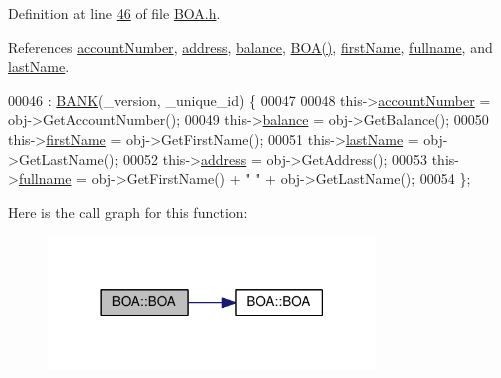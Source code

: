 Definition at line \hyperlink{_b_o_a_8h_source_l00046}{46} of file \hyperlink{_b_o_a_8h_source}{B\+O\+A.\+h}.



References \hyperlink{_b_o_a_8h_source_l00098}{account\+Number}, \hyperlink{_b_o_a_8h_source_l00100}{address}, \hyperlink{_b_o_a_8h_source_l00099}{balance}, \hyperlink{_b_o_a_8h_source_l00024}{B\+O\+A()}, \hyperlink{_b_o_a_8h_source_l00096}{first\+Name}, \hyperlink{_b_o_a_8h_source_l00095}{fullname}, and \hyperlink{_b_o_a_8h_source_l00097}{last\+Name}.


\begin{DoxyCode}
00046                                                                : \hyperlink{class_b_a_n_k_a0bc938356cebff14fb0560264abe5a34_a0bc938356cebff14fb0560264abe5a34}{BANK}(\_version, \_unique\_id) \{
00047  
00048         this->\hyperlink{class_b_o_a_a86ca4ad716db205f04c337b39b34d9ba_a86ca4ad716db205f04c337b39b34d9ba}{accountNumber} = obj->GetAccountNumber();
00049         this->\hyperlink{class_b_o_a_a2061c36a15924de9186ec5c83dc7da2f_a2061c36a15924de9186ec5c83dc7da2f}{balance} = obj->GetBalance();
00050         this->\hyperlink{class_b_o_a_acb1b3b2a69e403c4e0e3fb08fdbb52a0_acb1b3b2a69e403c4e0e3fb08fdbb52a0}{firstName} = obj->GetFirstName();
00051         this->\hyperlink{class_b_o_a_ab7749e6e945beaca57a3ef01259c6fea_ab7749e6e945beaca57a3ef01259c6fea}{lastName} = obj->GetLastName();
00052         this->\hyperlink{class_b_o_a_afb2d7d0c5c05169a72bbc6f1d2cc737f_afb2d7d0c5c05169a72bbc6f1d2cc737f}{address} = obj->GetAddress();
00053         this->\hyperlink{class_b_o_a_aed3225e383c08b1b7c962a0e43b180d1_aed3225e383c08b1b7c962a0e43b180d1}{fullname} = obj->GetFirstName() + \textcolor{stringliteral}{" "} + obj->GetLastName();
00054     \};
\end{DoxyCode}


Here is the call graph for this function\+:\nopagebreak
\begin{figure}[H]
\begin{center}
\leavevmode
\includegraphics[width=246pt]{class_b_o_a_ab87192ed986e601c2eb682ea3745daf0_ab87192ed986e601c2eb682ea3745daf0_cgraph}
\end{center}
\end{figure}


